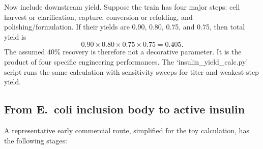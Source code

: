 Now include downstream yield. Suppose the train has four major steps:
cell harvest or clarification, capture, conversion or refolding, and
polishing/formulation. If their yields are 0.90, 0.80, 0.75, and 0.75,
then total yield is
\[
0.90 \times 0.80 \times 0.75 \times 0.75 = 0.405.
\]
The assumed 40\% recovery is therefore not a decorative parameter. It is
the product of four specific engineering performances. The
`insulin_yield_calc.py' script runs the same calculation with
sensitivity sweeps for titer and weakest-step yield.

\subsection{From E.\ coli inclusion body to active insulin}

A representative early commercial route, simplified for the toy
calculation, has the following stages:

